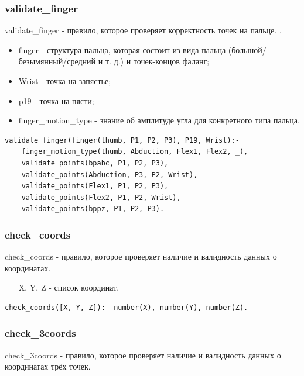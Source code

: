 \subsubsection{validate\_finger}
\hspace{0.6cm} validate\_finger - правило, которое проверяет корректность точек на пальце. .

\begin{itemize}
	\item finger - структура пальца, которая состоит из вида пальца (большой/безымянный/средний и т. д.) и точек-концов фаланг;
	\item Wrist - точка на запястье;
	\item p19 - точка на пясти;
	\item finger\_motion\_type - знание об амплитуде угла для конкретного типа пальца.
\end{itemize}

\begin{lstlisting}[caption=Реализация правила validate\_finger, label=rules:validatefinger]
validate_finger(finger(thumb, P1, P2, P3), P19, Wrist):-
	finger_motion_type(thumb, Abduction, Flex1, Flex2, _),
	validate_points(bpabc, P1, P2, P3),
	validate_points(Abduction, P3, P2, Wrist),
	validate_points(Flex1, P1, P2, P3),
	validate_points(Flex2, P1, P2, Wrist),
	validate_points(bppz, P1, P2, P3).
\end{lstlisting}

\subsubsection{check\_coords}
\hspace{0.6cm} check\_coords - правило, которое проверяет наличие и валидность данных о координатах.

\begin{itemize}
	\item [X, Y, Z] - список координат.
\end{itemize}

\begin{lstlisting}[caption=Реализация правила check\_coords, label=rules:checkcoords]
check_coords([X, Y, Z]):- number(X), number(Y), number(Z).
\end{lstlisting}

\subsubsection{check\_3coords}
\hspace{0.6cm} check\_3coords - правило, которое проверяет наличие и валидность данных о координатах трёх точек.

